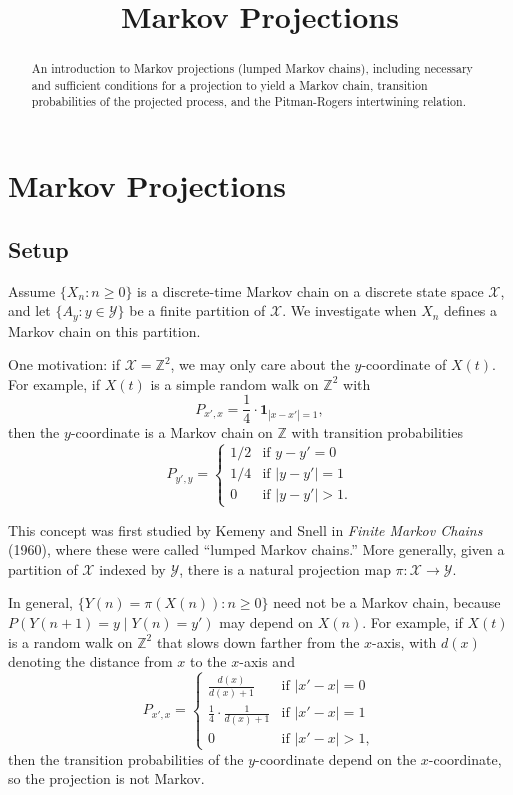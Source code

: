 \documentclass[12pt]{ximera}
\title{Markov Projections}
\begin{document}
\begin{abstract}
An introduction to Markov projections (lumped Markov chains), including necessary and sufficient conditions for a projection to yield a Markov chain, transition probabilities of the projected process, and the Pitman-Rogers intertwining relation.
\end{abstract}
\maketitle

\section*{Markov Projections}

\subsection*{Setup}

Assume $\{X_n : n \geq 0\}$ is a discrete-time Markov chain on a discrete state space $\mathcal{X}$, and let $\{A_y : y \in \mathcal{Y}\}$ be a finite partition of $\mathcal{X}$. We investigate when $X_n$ defines a Markov chain on this partition.

One motivation: if $\mathcal{X} = \mathbb{Z}^2$, we may only care about the $y$-coordinate of $X(t)$. For example, if $X(t)$ is a simple random walk on $\mathbb{Z}^2$ with
\[
P_{x',x} = \frac{1}{4} \cdot \mathbf{1}_{|x - x'| = 1},
\]
then the $y$-coordinate is a Markov chain on $\mathbb{Z}$ with transition probabilities
\[
P_{y',y} = \begin{cases} 1/2 & \text{if } y - y' = 0 \\ 1/4 & \text{if } |y - y'| = 1 \\ 0 & \text{if } |y - y'| > 1. \end{cases}
\]

This concept was first studied by Kemeny and Snell in \textit{Finite Markov Chains} (1960), where these were called ``lumped Markov chains.'' More generally, given a partition of $\mathcal{X}$ indexed by $\mathcal{Y}$, there is a natural projection map $\pi : \mathcal{X} \to \mathcal{Y}$.

In general, $\{Y(n) = \pi(X(n)) : n \geq 0\}$ need not be a Markov chain, because $P(Y(n+1) = y \mid Y(n) = y')$ may depend on $X(n)$. For example, if $X(t)$ is a random walk on $\mathbb{Z}^2$ that slows down farther from the $x$-axis, with $d(x)$ denoting the distance from $x$ to the $x$-axis and
\[
P_{x',x} = \begin{cases} \frac{d(x)}{d(x)+1} & \text{if } |x' - x| = 0 \\ \frac{1}{4} \cdot \frac{1}{d(x)+1} & \text{if } |x' - x| = 1 \\ 0 & \text{if } |x' - x| > 1, \end{cases}
\]
then the transition probabilities of the $y$-coordinate depend on the $x$-coordinate, so the projection is not Markov.
\end{document}
